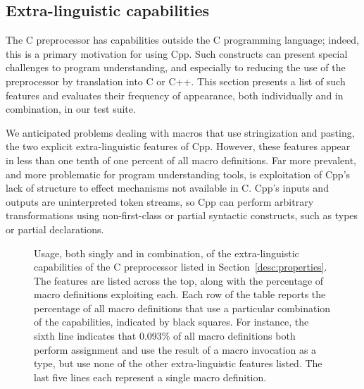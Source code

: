 \documentclass[10pt]{article}
\newcommand{\captionsmall}[1]{\caption[]{\small #1}}
\begin{document}





\subsection{Extra-linguistic capabilities}
\label{sec:extra-linguistic}

The C preprocessor has capabilities outside the C programming language;
indeed, this is a primary motivation for using Cpp.  Such constructs can
present special challenges to program understanding, and especially to
reducing the use of the preprocessor by translation into C or C++.  This
section
presents a list of such features and evaluates their frequency of
appearance, both individually and in combination, in our test suite.

We anticipated problems dealing with macros that use stringization and
pasting, the two explicit extra-linguistic features of Cpp.  However, these
features appear in less than one tenth of one percent of all macro
definitions.  Far more prevalent, and more problematic for program
understanding tools, is exploitation of Cpp's lack of structure to effect
mechanisms not available in C\@.  Cpp's inputs and outputs are
uninterpreted token streams, so Cpp can perform arbitrary transformations
using non-first-class or partial syntactic constructs, such as types or
partial declarations.

\begin{figure}
  {\small\centerline{}}
  
  \captionsmall{Usage, both singly and in
    combination, of the extra-linguistic capabilities of the C
    preprocessor listed in Section~\ref{desc:properties}.  The features are
    listed across the top, along with the percentage of macro definitions
    exploiting each.  Each row of the table reports the percentage of all
    macro definitions that use a particular combination of the
    capabilities, indicated by black squares.  For instance, the sixth
    line indicates that 0.093\% of all
    macro definitions both perform assignment and use the result of a macro
    invocation as a type, but use none of the other extra-linguistic
    features listed.  The last five lines each represent a single macro
    definition.}
  \label{fig:subset-properties}
\end{figure}
\end{document}
